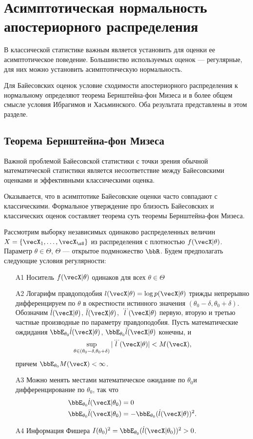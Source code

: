 \section{Асимптотическая нормальность апостериорного распределения}

В классической статистике важным является установить для оценки ее асимптотическое поведение.
Большинство используемых оценок --- регулярные, для них
можно установить асимптотическую нормальность.

Для Байесовских оценок условие сходимости апостериорного распределения к нормальному определяют теорема Бернштейна-фон Мизеса и в более общем смысле условия Ибрагимов и Хасьминского.
Оба результата представлены в этом разделе.


\subsection{Теорема Бернштейна-фон Мизеса}

Важной проблемой Байесовской статистики с точки зрения обычной математической статистики является несоответствие между Байесовскими оценками и эффективными классическими оценка.

Оказывается, что в асимптотике Байесовские оценки часто совпадают с классическими.
Формальное утверждение про близость Байесовских и классических оценок 
составляет теорема суть теоремы Бернштейна-фон Мизеса.

Рассмотрим выборку независимых одинаково распределенных величин $X = \{\vecX_1, \ldots, \vecX_{\sS} \}$ из распределения с плотностью $f(\vecX | \theta)$. 
Параметр $\theta \in \Theta$, $\Theta$ --- открытое подмножество $\bbR$.
Будем предполагать следующие условия регулярности:
\begin{itemize}
	\item[A1] Носитель $f(\vecX | \theta)$ одинаков для всех $\theta \in \Theta$
	\item[A2] Логарифм правдоподобия $l(\vecX | \theta) = \log p(\vecX | \theta)$ трижды непрерывно дифференцируем по $\theta$ в окрестности истинного значения $(\theta_0 - \delta, \theta_0 + \delta)$. Обозначим $\dot{l}(\vecX | \theta)$,
	$\ddot{l}(\vecX | \theta)$, $\dddot{l}(\vecX | \theta)$ первую, вторую и третью частные производные по параметру правдоподобия. Пусть математические ождидания $\bbE_{\theta_0} \dot{l}(\vecX | \theta)$, 
	$\bbE_{\theta_0} \ddot{l}(\vecX | \theta)$ конечны, и
	\[
	\sup_{\theta \in (\theta_0 - \delta, \theta_0 + \delta)} |\dddot{l}(\vecX | \theta)| < M(\vecX),
	\]
	причем $\bbE_{\theta_0} M(\vecX) < \infty$.
	\item[A3] Можно менять местами математическое ожидание по $\theta_0$и дифференцирование по $\theta_0$, так что
	\begin{align*}
	\bbE_{\theta_0} \dot{l}(\vecX | \theta_0) &= 0 \\
	\bbE_{\theta_0} \ddot{l}(\vecX | \theta_0) &= - \bbE_{\theta_0} (\dot{l}(\vecX | \theta))^2.
	\end{align*}
	\item[A4] Информация Фишера $I(\theta_0)^2 = \bbE_{\theta_0} (\dot{l}(\vecX | \theta_0))^2 > 0$.
\end{itemize}

